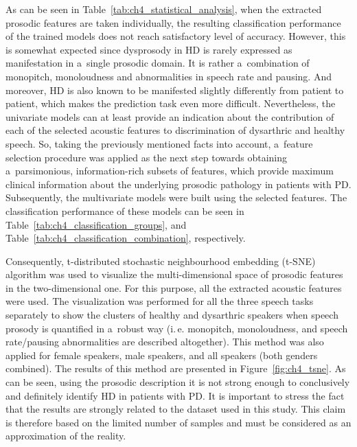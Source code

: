 As can be seen in Table~\ref{tab:ch4_statistical_analysis}, when the extracted prosodic features are taken individually, the resulting classification performance of the trained models does not reach satisfactory level of accuracy. However, this is somewhat expected since dysprosody in HD is rarely expressed as manifestation in a~single prosodic domain. It is rather a~combination of monopitch, monoloudness and abnormalities in speech rate and pausing. And moreover, HD is also known to be manifested slightly differently from patient to patient, which makes the prediction task even more difficult. Nevertheless, the univariate models can at least provide an indication about the contribution of each of the selected acoustic features to discrimination of dysarthric and healthy speech. So, taking the previously mentioned facts into account, a~feature selection procedure was applied as the next step towards obtaining a~parsimonious, information-rich subsets of features, which provide maximum clinical information about the underlying prosodic pathology in patients with PD. Subsequently, the multivariate models were built using the selected features. The classification performance of these models can be seen in Table~\ref{tab:ch4_classification_groups}, and Table~\ref{tab:ch4_classification_combination}, respectively.

Consequently, t-distributed stochastic neighbourhood embedding (t-SNE)~\cite{Maaten2008} algorithm was used to visualize the multi-dimensional space of prosodic features in the two-dimensional one. For this purpose, all the extracted acoustic features were used. The visualization was performed for all the three speech tasks separately to show the clusters of healthy and dysarthric speakers when speech prosody is quantified in a~robust way (i.\,e. monopitch, monoloudness, and speech rate/pausing abnormalities are described altogether). This method was also applied for female speakers, male speakers, and all speakers (both genders combined). The results of this method are presented in Figure~\ref{fig:ch4_tsne}. As can be seen, using the prosodic description it is not strong enough to conclusively and definitely identify HD in patients with PD. It is important to stress the fact that the results are strongly related to the dataset used in this study. This claim is therefore based on the limited number of samples and must be considered as an approximation of the reality.

